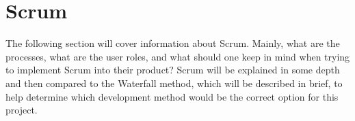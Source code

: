 \section{Scrum}

The following section will cover information about Scrum. Mainly, what are the 
processes, what are the user roles, and what should one keep in mind when 
trying to implement Scrum into their product? Scrum will be explained in some 
depth and then compared to the Waterfall method, which will be described in 
brief, to help determine which development method would be the correct option 
for this project.




